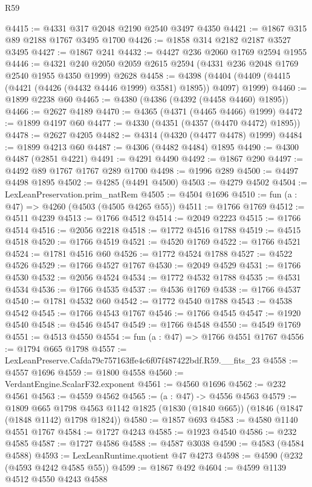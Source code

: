 \begin{lexlean}{R59}
\begin{coremodule}
@4415 := @4331 @317 @2048 @2190 @2540 @3497 @4350
@4421 := @1867 @315 @89 @2188 @1767 @3495 @1700
@4426 := @1858 @314 @2182 @2187 @3527 @3495
@4427 := @1867 @241
@4432 := @4427 @236 @2060 @1769 @2594 @1955
@4446 := @4321 @240 @2050 @2059 @2615 @2594 (@4331 @236 @2048 @1769 @2540 @1955 @4350 @1999) @2628
@4458 := @4398 (@4404 (@4409 (@4415 (@4421 (@4426 (@4432 @4446 @1999) @3581) @1895)) @4097) @1999)
@4460 := @1899 @2238 @60
@4465 := @4380 (@4386 (@4392 (@4458 @4460) @1895))
@4466 := @2627 @4189
@4470 := @4365 (@4371 (@4465 @4466) @1999)
@4472 := @1899 @4197 @60
@4477 := @4330 (@4351 (@4357 (@4470 @4472) @1895))
@4478 := @2627 @4205
@4482 := @4314 (@4320 (@4477 @4478) @1999)
@4484 := @1899 @4213 @60
@4487 := @4306 (@4482 @4484) @1895
@4490 := @4300 @4487 (@2851 @4221)
@4491 := @4291 @4490
@4492 := @1867 @290
@4497 := @4492 @89 @1767 @1767 @289 @1700
@4498 := @1996 @289
@4500 := @4497 @4498 @1895
@4502 := @4285 (@4491 @4500)
@4503 := @4279 @4502
@4504 := LexLeanPreservation.prim_natRem
@4505 := @4504 @1696
@4510 := fun (a : @47) => @4260 (@4503 (@4505 @4265 @55))
@4511 := @1766 @1769
@4512 := @4511 @4239
@4513 := @1766 @4512
@4514 := @2049 @2223
@4515 := @1766 @4514
@4516 := @2056 @2218
@4518 := @1772 @4516 @1788
@4519 := @4515 @4518
@4520 := @1766 @4519
@4521 := @4520 @1769
@4522 := @1766 @4521
@4524 := @1781 @4516 @60
@4526 := @1772 @4524 @1788
@4527 := @4522 @4526
@4529 := @1766 @4527 @1767
@4530 := @2049 @4529
@4531 := @1766 @4530
@4532 := @2056 @4524
@4534 := @1772 @4532 @1788
@4535 := @4531 @4534
@4536 := @1766 @4535
@4537 := @4536 @1769
@4538 := @1766 @4537
@4540 := @1781 @4532 @60
@4542 := @1772 @4540 @1788
@4543 := @4538 @4542
@4545 := @1766 @4543 @1767
@4546 := @1766 @4545
@4547 := @1920 @4540
@4548 := @4546 @4547
@4549 := @1766 @4548
@4550 := @4549 @1769
@4551 := @4513 @4550
@4554 := fun (a : @47) => @1766 @4551 @1767
@4556 := @1794 @665 @1798
@4557 := LexLeanPreserve.Cafda79c757163ffe4c6f07f487422bdf.R59.__fits_23
@4558 := @4557 @1696
@4559 := @1800 @4558
@4560 := VerdantEngine.ScalarF32.exponent
@4561 := @4560 @1696
@4562 := @232 @4561
@4563 := @4559 @4562
@4565 := (a : @47) -> @4556 @4563
@4579 := @1809
    @665
    @1798
    @4563
    @1142
    @1825
    (@1830 (@1840 @665))
    (@1846 (@1847 (@1848 @1142) @1798 @1824))
@4580 := @1857 @693
@4583 := @4580 @1140 @4551 @1767
@4584 := @1727 @4243
@4585 := @1923 @4540
@4586 := @232 @4585
@4587 := @1727 @4586
@4588 := @4587 @3038
@4590 := @4583 (@4584 @4588)
@4593 := LexLeanRuntime.quotient @47 @4273
@4598 := @4590 (@232 (@4593 @4242 @4585 @55))
@4599 := @1867 @492
@4604 := @4599 @1139 @4512 @4550 @4243 @4588

\end{coremodule}
\end{lexlean}
